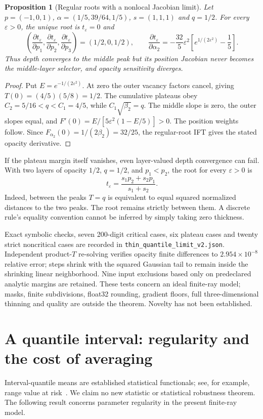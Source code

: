 \documentclass[11pt,a4paper]{article}
\newtheorem{proposition}[theorem]{Proposition}
\begin{document}
\begin{proposition}[Regular roots with a nonlocal Jacobian limit]
Let $p=(-1,0,1)$, $\alpha=(1/5,39/64,1/5)$, $s=(1,1,1)$ and $q=1/2$.
For every $\varepsilon>0$, the unique root is $t_\varepsilon=0$ and
\[
 \left(\frac{\partial t_\varepsilon}{\partial p_1},
 \frac{\partial t_\varepsilon}{\partial p_2},
 \frac{\partial t_\varepsilon}{\partial p_3}\right)=(1/2,0,1/2),
 \qquad
 \frac{\partial t_\varepsilon}{\partial\alpha_2}
 =-\frac{32}{5}\varepsilon^2
 \left[e^{1/(2\varepsilon^2)}-\frac15\right].
\]
Thus depth converges to the middle peak but its position Jacobian
never becomes the middle-layer selector, and opacity sensitivity diverges.
\end{proposition}
\begin{proof}
Put $E=e^{-1/(2\varepsilon^2)}$. At zero the outer vacancy factors
cancel, giving $T(0)=(4/5)(5/8)=1/2$.
The cumulative plateaus obey $C_2=5/16<q<C_1=4/5$, while
$C_1\sqrt{\beta_2}=q$. The middle slope is zero, the outer slopes equal,
and $F'(0)=E/[5\varepsilon^2(1-E/5)]>0$.
The position weights follow. Since $F_{\alpha_2}(0)=1/(2\beta_2)=32/25$,
the regular-root IFT gives the stated opacity derivative.
\end{proof}

If the plateau margin itself vanishes, even layer-valued depth
convergence can fail. With two layers of opacity $1/2$, $q=1/2$,
and $p_1<p_2$, the root for every $\varepsilon>0$ is
\[
 t_\varepsilon=\frac{s_1p_2+s_2p_1}{s_1+s_2}.
\]
Indeed, between the peaks $T=q$ is equivalent to equal squared
normalized distances to the two peaks. The root remains strictly
between them. A discrete rule's equality convention cannot be
inferred by simply taking zero thickness.

Exact symbolic checks, seven 200-digit critical cases, six plateau
cases and twenty strict noncritical cases are recorded in
\texttt{thin\_quantile\_limit\_v2.json}. Independent product-$T$
re-solving verifies opacity finite differences to $2.954\times10^{-8}$
relative error; steps shrink with the squared Gaussian tail to remain
inside the shrinking linear neighborhood. Nine input exclusions based
only on predeclared analytic margins are retained. These tests concern
an ideal finite-ray model; masks, finite subdivisions, float32 rounding,
gradient floors, full three-dimensional thinning and quality are outside
the theorem. Novelty has not been established.

\section{A quantile interval: regularity and the cost of averaging}
Interval-quantile means are established statistical functionals; see, for
example, range value at risk~\cite{rvar}. We claim no new statistic or
statistical robustness theorem. The following result concerns parameter
regularity in the present finite-ray model.
\end{document}
